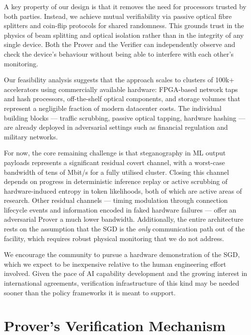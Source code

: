 \documentclass{article}
\begin{document}
A key property of our design is that it removes the need for processors trusted by both parties. Instead, we achieve mutual verifiability via passive optical fibre splitters and coin-flip protocols for shared randomness. This grounds trust in the physics of beam splitting and optical isolation rather than in the integrity of any single device. Both the Prover and the Verifier can independently observe and check the device's behaviour without being able to interfere with each other's monitoring.

Our feasibility analysis suggests that the approach scales to clusters of 100k+ accelerators using commercially available hardware: FPGA-based network taps and hash processors, off-the-shelf optical components, and storage volumes that represent a negligible fraction of modern datacenter costs. The individual building blocks --- traffic scrubbing, passive optical tapping, hardware hashing --- are already deployed in adversarial settings such as financial regulation and military networks.

For now, the core remaining challenge is that steganography in ML output payloads represents a significant residual covert channel, with a worst-case bandwidth of tens of Mbit/s for a fully utilised cluster. Closing this channel depends on progress in deterministic inference replay or active scrubbing of hardware-induced entropy in token likelihoods, both of which are active areas of research. Other residual channels --- timing modulation through connection lifecycle events and information encoded in faked hardware failures --- offer an adversarial Prover a much lower bandwidth. Additionally, the entire architecture rests on the assumption that the SGD is the \textit{only} communication path out of the facility, which requires robust physical monitoring that we do not address.

We encourage the community to pursue a hardware demonstration of the SGD, which we expect to be inexpensive relative to the human engineering effort involved. Given the pace of AI capability development and the growing interest in international agreements, verification infrastructure of this kind may be needed sooner than the policy frameworks it is meant to support.




\newpage
\appendix
{}
\onecolumn

\section{Prover's Verification Mechanism}
\label{app:verification}
\end{document}
